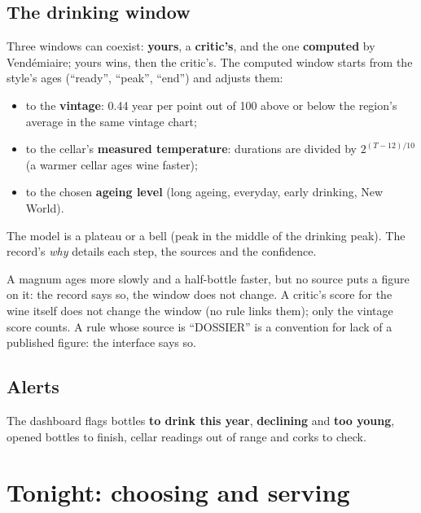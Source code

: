\documentclass[11pt,a4paper]{article}
\begin{document}
\subsection{The drinking window}
Three windows can coexist: \textbf{yours}, a \textbf{critic's}, and the one \textbf{computed} by Vendémiaire;
yours wins, then the critic's. The computed window starts from the style's ages (``ready'', ``peak'',
``end'') and adjusts them:
\begin{itemize}
  \item to the \textbf{vintage}: 0.44 year per point out of 100 above or below the region's average in the
        same vintage chart;
  \item to the cellar's \textbf{measured temperature}: durations are divided by $2^{(T-12)/10}$ (a warmer
        cellar ages wine faster);
  \item to the chosen \textbf{ageing level} (long ageing, everyday, early drinking, New World).
\end{itemize}
The model is a plateau or a bell (peak in the middle of the drinking peak). The record's \emph{why} details
each step, the sources and the confidence.


\begin{sources}
A magnum ages more slowly and a half-bottle faster, but no source puts a figure on it: the record says so, the
window does not change. A critic's score for the wine itself does not change the window (no rule links them);
only the vintage score counts. A rule whose source is ``DOSSIER'' is a convention for lack of a published
figure: the interface says so.
\end{sources}

\subsection{Alerts}
The dashboard flags bottles \textbf{to drink this year}, \textbf{declining} and \textbf{too young}, opened
bottles to finish, cellar readings out of range and corks to check.

\section{Tonight: choosing and serving}
\end{document}
